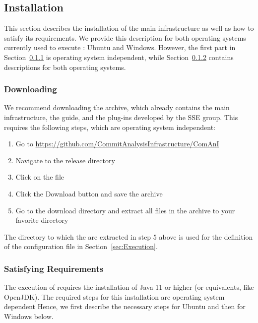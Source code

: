 \subsection{Installation}
\label{sec:Installation}
This section describes the installation of the main infrastructure as well as how to satisfy its requirements. We provide this description for both operating systems currently used to execute \thetool{}: Ubuntu and Windows. However, the first part in Section~\ref{sec:Download} is operating system independent, while Section~\ref{sec:Requirements} contains descriptions for both operating systems.

\subsubsection{Downloading \thetool{}}
\label{sec:Download}
We recommend downloading the  archive, which already contains the main infrastructure, the guide, and the plug-ins developed by the SSE group. This requires the following steps, which are operating system independent:
\begin{enumerate}
	\item Go to \url{https://github.com/CommitAnalysisInfrastructure/ComAnI}
	\item Navigate to the release directory
	\item Click on the  file
	\item Click the Download button and save the archive
	\item Go to the download directory and extract all files in the  archive to your favorite directory
\end{enumerate}
The directory to which the  are extracted in step 5 above is used for the definition of the configuration file in Section~\ref{sec:Execution}.

\subsubsection{Satisfying Requirements}
\label{sec:Requirements}
The execution of \thetool{} requires the installation of Java 11 or higher (or equivalents, like OpenJDK). The required steps for this installation are operating system dependent Hence, we first describe the necessary steps for Ubuntu and then for Windows below.

